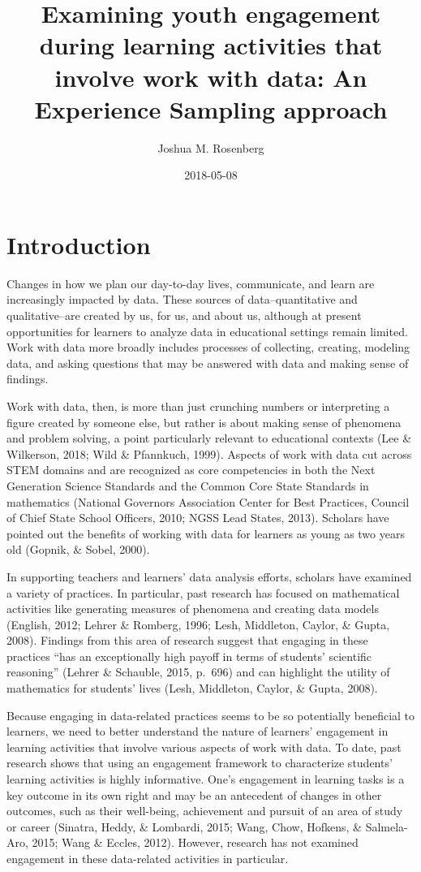 \documentclass[]{book}
\title{Examining youth engagement during learning activities that involve work
with data: An Experience Sampling approach}
\author{Joshua M. Rosenberg}
\date{2018-05-08}
\theoremstyle{definition}
\theoremstyle{definition}
\theoremstyle{definition}
\theoremstyle{remark}
\begin{document}
\maketitle

{
\setcounter{tocdepth}{1}
\tableofcontents
}
\chapter{Introduction}\label{intro-placemarker}

Changes in how we plan our day-to-day lives, communicate, and learn are
increasingly impacted by data. These sources of data--quantitative and
qualitative--are created by us, for us, and about us, although at
present opportunities for learners to analyze data in educational
settings remain limited. Work with data more broadly includes processes
of collecting, creating, modeling data, and asking questions that may be
answered with data and making sense of findings.

Work with data, then, is more than just crunching numbers or
interpreting a figure created by someone else, but rather is about
making sense of phenomena and problem solving, a point particularly
relevant to educational contexts (Lee \& Wilkerson, 2018; Wild \&
Pfannkuch, 1999). Aspects of work with data cut across STEM domains and
are recognized as core competencies in both the Next Generation Science
Standards and the Common Core State Standards in mathematics (National
Governors Association Center for Best Practices, Council of Chief State
School Officers, 2010; NGSS Lead States, 2013). Scholars have pointed
out the benefits of working with data for learners as young as two years
old (Gopnik, \& Sobel, 2000).

In supporting teachers and learners' data analysis efforts, scholars
have examined a variety of practices. In particular, past research has
focused on mathematical activities like generating measures of phenomena
and creating data models (English, 2012; Lehrer \& Romberg, 1996; Lesh,
Middleton, Caylor, \& Gupta, 2008). Findings from this area of research
suggest that engaging in these practices ``has an exceptionally high
payoff in terms of students' scientific reasoning'' (Lehrer \& Schauble,
2015, p.~696) and can highlight the utility of mathematics for students'
lives (Lesh, Middleton, Caylor, \& Gupta, 2008).

Because engaging in data-related practices seems to be so potentially
beneficial to learners, we need to better understand the nature of
learners' engagement in learning activities that involve various aspects
of work with data. To date, past research shows that using an engagement
framework to characterize students' learning activities is highly
informative. One's engagement in learning tasks is a key outcome in its
own right and may be an antecedent of changes in other outcomes, such as
their well-being, achievement and pursuit of an area of study or career
(Sinatra, Heddy, \& Lombardi, 2015; Wang, Chow, Hofkens, \& Salmela-Aro,
2015; Wang \& Eccles, 2012). However, research has not examined
engagement in these data-related activities in particular.
\end{document}
